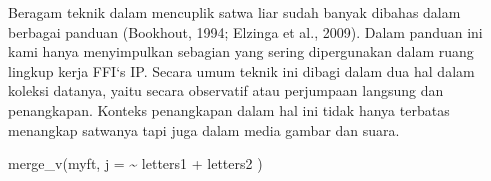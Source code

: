 \documentclass[
]{book}
\newenvironment{Shaded}{\begin{snugshade}}{\end{snugshade}}
\newcommand{\AttributeTok}[1]{\textcolor[rgb]{0.77,0.63,0.00}{#1}}
\newcommand{\FunctionTok}[1]{\textcolor[rgb]{0.00,0.00,0.00}{#1}}
\newcommand{\NormalTok}[1]{#1}
\newcommand{\SpecialCharTok}[1]{\textcolor[rgb]{0.00,0.00,0.00}{#1}}
\begin{document}
Beragam teknik dalam mencuplik satwa liar sudah banyak dibahas dalam berbagai panduan (Bookhout, 1994; Elzinga et al., 2009). Dalam panduan ini kami hanya menyimpulkan sebagian yang sering dipergunakan dalam ruang lingkup kerja FFI`s IP. Secara umum teknik ini dibagi dalam dua hal dalam koleksi datanya, yaitu secara observatif atau perjumpaan langsung dan penangkapan. Konteks penangkapan dalam hal ini tidak hanya terbatas menangkap satwanya tapi juga dalam media gambar dan suara.

\begin{Shaded}
\begin{Highlighting}[]
\FunctionTok{merge\_v}\NormalTok{(myft, }\AttributeTok{j =} \SpecialCharTok{\textasciitilde{}}\NormalTok{ letters1 }\SpecialCharTok{+}\NormalTok{ letters2 )}
\end{Highlighting}
\end{Shaded}

\providecommand{\docline}[3]{\noalign{\global\setlength{\arrayrulewidth}{#1}}\arrayrulecolor[HTML]{#2}\cline{#3}}

\setlength{\tabcolsep}{2pt}

\renewcommand*{\arraystretch}{1.5}
\end{document}
